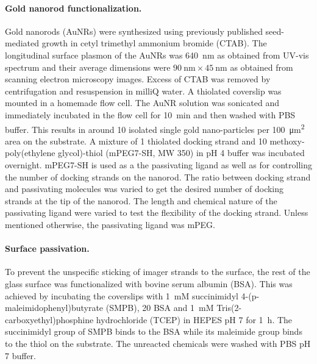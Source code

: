 \paragraph*{Gold nanorod functionalization.} Gold nanorods (AuNRs) were synthesized using previously published seed-mediated growth in cetyl trimethyl ammonium bromide (CTAB). \cite{nikoobakht2003preparation}
The longitudinal surface plasmon of the AuNRs was \SI{640}{\nm} as obtained from UV-vis spectrum and their average dimensions were $\SI{90}{\nm}\times\SI{45}{\nm}$ as obtained from scanning electron microscopy images.
Excess of CTAB was removed by centrifugation and resuspension in milliQ water.
A thiolated coverslip was mounted in a homemade flow cell.
The AuNR solution was sonicated and immediately incubated in the flow cell for 10~min and then washed with PBS buffer.
This results in around 10 isolated single gold nano-particles per \SI{100}{\um\squared} area on the substrate.
A mixture of \SI{1}{\nM} thiolated docking strand and \SI{10}{\uM} methoxy-poly(ethylene glycol)-thiol (mPEG7-SH, MW 350) in pH 4 buffer was incubated overnight.
mPEG7-SH is used as a the passivating ligand as well as for controlling the number of docking strands on the nanorod.
The ratio between docking strand and passivating molecules was varied to get the desired number of docking strands at the tip of the nanorod.
The length and chemical nature of the passivating ligand were varied to test the flexibility of the docking strand.
Unless mentioned otherwise, the passivating ligand was mPEG.


\paragraph*{Surface passivation.} To prevent the unspecific sticking of imager strands to the surface, the rest of the glass surface was functionalized with bovine serum albumin (BSA).
This was achieved by incubating the coverslips with \SI{1}{mM} succinimidyl 4-(p-maleimidophenyl)butyrate (SMPB), \SI{20}{\uM} BSA and \SI{1}{mM} Tris(2-carboxyethyl)phosphine hydrochloride (TCEP) in HEPES pH 7 for \SI{1}{\hour}.
The succinimidyl group of SMPB binds to the BSA while its maleimide group binds to the thiol on the substrate. 
The unreacted chemicals were washed with PBS pH 7 buffer.


